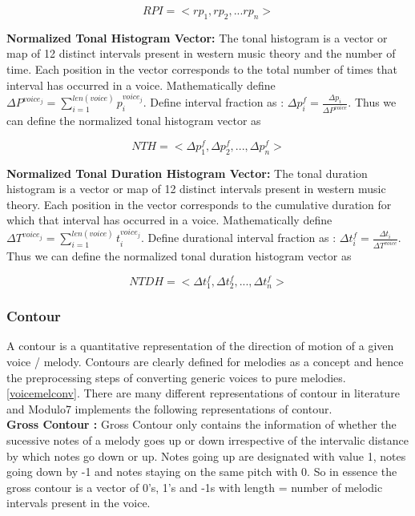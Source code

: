 \begin{equation}
RPI = <rp_1, rp_2, ... rp_n>
\end{equation}

\noindent \textbf{Normalized Tonal Histogram Vector:} The tonal histogram is a vector or map of 12 distinct intervals present in western music theory and the number of time. Each position in the vector corresponds to the total number of times that interval has occurred in a voice. Mathematically define $\Delta P^{voice_j} = \sum_{i=1}^{len(voice)} p_i^{voice_j}$. Define interval fraction as : $\Delta p^f_i = \frac{\Delta p_i}{\Delta P^{voice}}$. Thus we can define the normalized tonal histogram vector as

\begin{equation}
NTH = <\Delta p^f_1, \Delta p^f_2, ... , \Delta p^f_n>
\end{equation}

\noindent \textbf{Normalized Tonal Duration Histogram Vector:} The tonal duration histogram is a vector or map of 12 distinct intervals present in western music theory. Each position in the vector corresponds to the cumulative duration for which that interval has occurred in a voice. Mathematically define $\Delta T^{voice_j} = \sum_{i=1}^{len(voice)} t_i^{voice_j}$. Define durational interval fraction as : $\Delta t^f_i = \frac{\Delta t_i}{\Delta T^{voice}}$. Thus we can define the normalized tonal duration histogram vector as

\begin{equation}
NTDH = <\Delta t^f_1, \Delta t^f_2, ... , \Delta t^f_n>
\end{equation}

\subsubsection{Contour}

\noindent A contour is a quantitative representation of the direction of motion of a given voice / melody. Contours are clearly defined for melodies as a concept and hence the preprocessing steps of converting generic voices to pure melodies.\ref{voicemelconv}. There are many different representations of contour in literature and Modulo7 implements the following representations of contour. \\

\noindent \textbf{Gross Contour : } Gross Contour only contains the information of whether the sucessive notes of a melody goes up or down irrespective of the intervalic distance by which notes go down or up. Notes going up are designated with value 1, notes going down by -1 and notes staying on the same pitch with 0. So in essence the gross contour is a vector of 0's, 1's and -1s with length = number of melodic intervals present in the voice.\\


